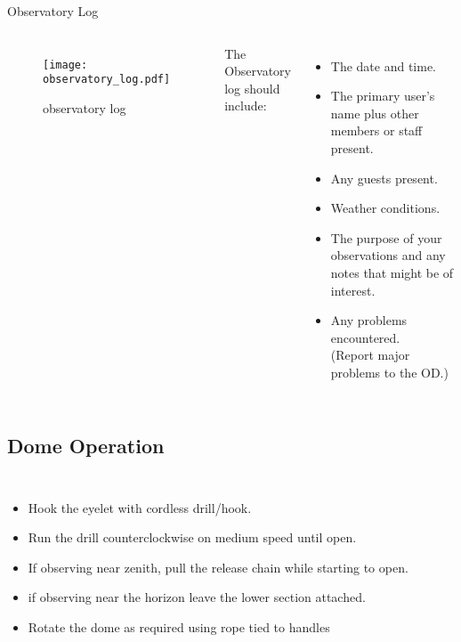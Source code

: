 \begin{frame}[t]{Observatory Log}
\begin{columns}[T]
    \begin{figure}[h]
        \texttt{[image: observatory\_log.pdf]}
      \caption{observatory log}
    \end{figure}

  {\Large
    The Observatory log should include:}
    \begin{itemize}
      \item The date and time.
      \item The primary user's name plus other members or staff present.
      \item Any guests present.
      \item Weather conditions.
      \item The purpose of your observations and any notes that might be of interest.
      \item Any problems encountered.\\
            (Report major problems to the OD.)
    \end{itemize}
\end{columns}
\end{frame}


\subsection{Dome Operation}

\begin{frame}[t]{\insertsubsectionhead}
  \begin{columns}[T]
    \centering
  
    \large
      \begin{itemize}
        \item Hook the eyelet with cordless drill/hook. 
        \item Run the drill counterclockwise on medium speed until open.
        \item If observing near zenith, pull the release chain while starting to open.
        \item if observing near the horizon leave the lower section attached.
        \item Rotate the dome as required using rope tied to handles
      \end{itemize}
  \end{columns}
  \end{frame}

